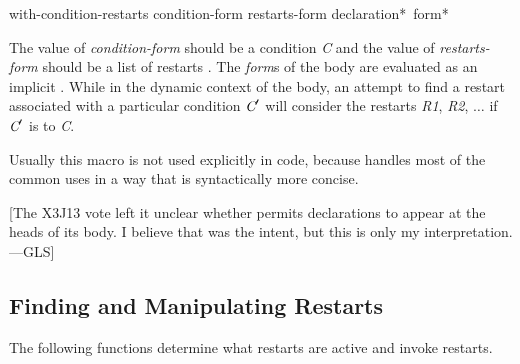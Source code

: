 \begin{defmac}
with-condition-restarts condition-form restarts-form
  {declaration}* {\,form}*

The value of \emph{condition-form} should be a condition \emph{C} and
the value of \emph{restarts-form} should be a list of restarts .
      The \emph{form\/}s of the body are evaluated as an implicit .
      While in the dynamic context of the body,
      an attempt to find a restart associated with a particular
      condition $\emph{C}'$ will 
      consider the restarts \emph{R1}, \emph{R2}, $\ldots$ if $\emph{C}'$ is  to \emph{C}.

     Usually this macro is not used explicitly in code, because
      handles most of the common uses in a way that is
     syntactically more concise.

[The X3J13 vote  left it unclear whether 
permits declarations to appear at the heads of its body.
I believe that was the intent, but this is only my interpretation.---GLS]

\end{defmac}


\subsection{Finding and Manipulating Restarts}

The following functions determine what restarts are
active and invoke restarts.

